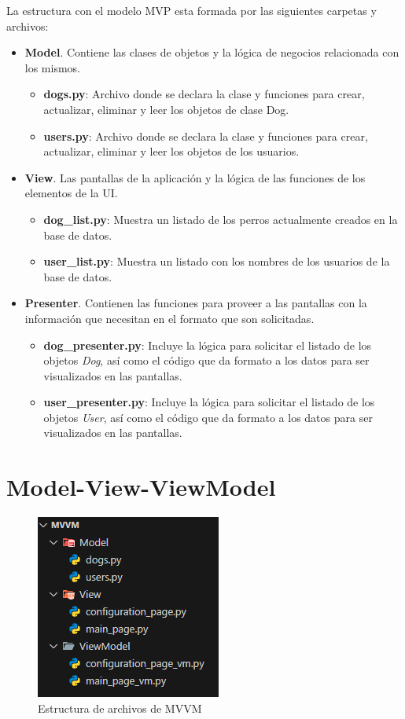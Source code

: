 \documentclass[11pt]{article}
\begin{document}
		\par La estructura con el modelo MVP esta formada por las siguientes carpetas y archivos:
		\begin{itemize}
			\item \textbf{Model}. Contiene las clases de objetos y la lógica de negocios relacionada con los mismos.
			\begin{itemize}
				\item \textbf{dogs.py}: Archivo donde se declara la clase y funciones para crear, actualizar, eliminar y leer los objetos de clase Dog.
				\item \textbf{users.py}: Archivo donde se declara la clase y funciones para crear, actualizar, eliminar y leer los objetos de los usuarios.
			\end{itemize}
			\item \textbf{View}. Las pantallas de la aplicación y la lógica de las funciones de los elementos de la UI.
			\begin{itemize}
				\item \textbf{dog\_list.py}: Muestra un listado de los perros actualmente creados en la base de datos.
				\item \textbf{user\_list.py}: Muestra un listado con los nombres de los usuarios de la base de datos.
			\end{itemize}
			\item \textbf{Presenter}. Contienen las funciones para proveer a las pantallas con la información que necesitan en el formato que son solicitadas.
			\begin{itemize}
				\item \textbf{dog\_presenter.py}: Incluye la lógica para solicitar el listado de los objetos \textit{Dog}, así como el código que da formato a los datos para ser visualizados en las pantallas.
				\item \textbf{user\_presenter.py}: Incluye la lógica para solicitar el listado de los objetos \textit{User}, así como el código que da formato a los datos para ser visualizados en las pantallas.
			\end{itemize}
		\end{itemize}
	\newpage \section{Model-View-ViewModel}

		\begin{figure}[ht!]
			\centering
			\includegraphics[width=0.3\linewidth]{img/mvvm.png}
			\caption{Estructura de archivos de MVVM}
			\label{fig:mvvm}
		\end{figure}
		
\end{document}
